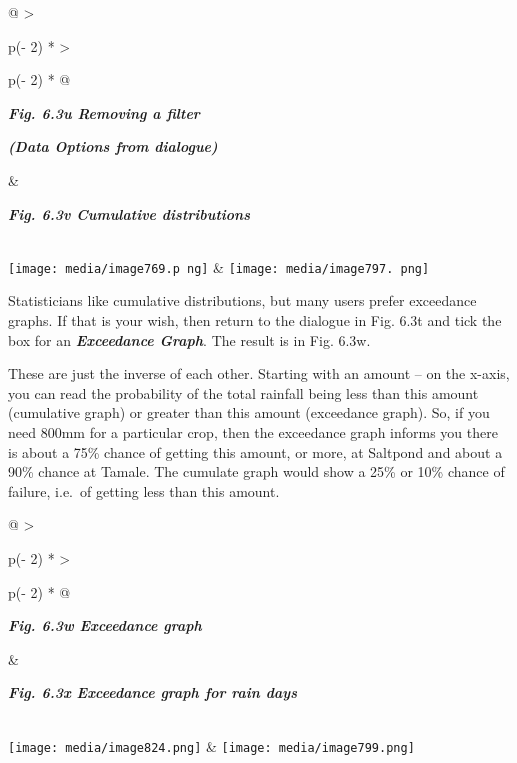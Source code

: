 \documentclass[
  letterpaper,
  DIV=11,
  numbers=noendperiod]{scrreprt}
\begin{document}
\begin{longtable}[]{@{}
  >{\raggedright\arraybackslash}p{(\columnwidth - 2\tabcolsep) * }
  >{\raggedright\arraybackslash}p{(\columnwidth - 2\tabcolsep) * }@{}}
\toprule\noalign{}
\begin{minipage}[b]{\linewidth}\raggedright
\textbf{\emph{Fig. 6.3u Removing a filter}}

\textbf{\emph{(Data Options from dialogue)}}
\end{minipage} & \begin{minipage}[b]{\linewidth}\raggedright
\textbf{\emph{Fig. 6.3v Cumulative distributions}}
\end{minipage} \\
\midrule\noalign{}
\endhead
\bottomrule\noalign{}
\endlastfoot
\texttt{[image: media/image769.p ng]}
&
\texttt{[image: media/image797. png]} \\
\end{longtable}

Statisticians like cumulative distributions, but many users prefer
exceedance graphs. If that is your wish, then return to the dialogue in
Fig. 6.3t and tick the box for an \textbf{\emph{Exceedance Graph}}. The
result is in Fig. 6.3w.

These are just the inverse of each other. Starting with an amount -- on
the x-axis, you can read the probability of the total rainfall being
less than this amount (cumulative graph) or greater than this amount
(exceedance graph). So, if you need 800mm for a particular crop, then
the exceedance graph informs you there is about a 75\% chance of getting
this amount, or more, at Saltpond and about a 90\% chance at Tamale. The
cumulate graph would show a 25\% or 10\% chance of failure, i.e.~of
getting less than this amount.

\begin{longtable}[]{@{}
  >{\raggedright\arraybackslash}p{(\columnwidth - 2\tabcolsep) * }
  >{\raggedright\arraybackslash}p{(\columnwidth - 2\tabcolsep) * }@{}}
\toprule\noalign{}
\begin{minipage}[b]{\linewidth}\raggedright
\textbf{\emph{Fig. 6.3w Exceedance graph}}
\end{minipage} & \begin{minipage}[b]{\linewidth}\raggedright
\textbf{\emph{Fig. 6.3x Exceedance graph for rain days}}
\end{minipage} \\
\midrule\noalign{}
\endhead
\bottomrule\noalign{}
\endlastfoot
\texttt{[image: media/image824.png]} &
\texttt{[image: media/image799.png]} \\
\end{longtable}
\end{document}
